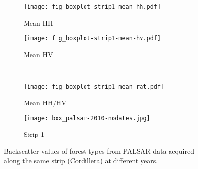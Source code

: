 \begin{figure}[!ht] \centering
	\captionsetup[subfigure]{width=2.0in} %
	\begin{subfigure}[t]{0.49\textwidth}
		\texttt{[image: fig\_boxplot-strip1-mean-hh.pdf]}
		\caption[Same strip backscatter boxplots.]{Mean HH}
		\label{fig: result-fig4.5a}
	\end{subfigure}
	\begin{subfigure}[t]{0.49\textwidth}
		\texttt{[image: fig\_boxplot-strip1-mean-hv.pdf]}
		\caption[Same strip backscatter boxplots.]{Mean HV}
		\label{fig: result-fig4.5b}
	\end{subfigure}\\
	\vspace{10pt}
	\begin{subfigure}[t]{0.49\textwidth}
		\texttt{[image: fig\_boxplot-strip1-mean-rat.pdf]}
		\caption[Same strip backscatter boxplots.]{Mean HH/HV}
		\label{fig: result-fig4.5c}
	\end{subfigure}
	\begin{subfigure}[t]{0.49\textwidth}
		\texttt{[image: box\_palsar-2010-nodates.jpg]}
		\caption[Same strip backscatter boxplots.]{Strip 1}
		\label{fig: result-fig4.5d}
	\end{subfigure}
	\caption[Backscatter values of forest types from PALSAR data acquired along the same strip (Cordillera) at different years.]{Backscatter values of forest types from PALSAR data acquired along the same strip (Cordillera) at different years.}
	\label{fig: result-fig4.5}
\end{figure}

